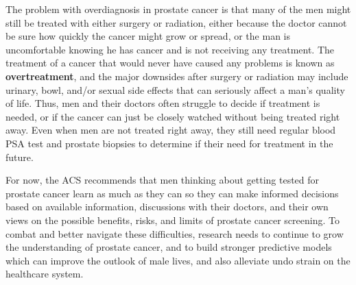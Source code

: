 The problem with overdiagnosis in prostate cancer is that many of the men might still be treated with either surgery or radiation, either because the doctor cannot be sure how quickly the cancer might grow or spread, or the man is uncomfortable knowing he has cancer and is not receiving any treatment. The treatment of a cancer that would never have caused any problems is known as \textbf{overtreatment}, and the major downsides after surgery or radiation may include urinary, bowl, and/or sexual side effects that can seriously affect a man's quality of life. Thus, men and their doctors often struggle to decide if treatment is needed, or if the cancer can just be closely watched without being treated right away. Even when men are not treated right away, they still need regular blood PSA test and prostate biopsies to determine if their need for treatment in the future. \par
For now, the ACS recommends that men thinking about getting tested for prostate cancer learn as much as they can so they can make informed decisions based on available information, discussions with their doctors, and their own views on the possible benefits, risks, and limits of prostate cancer screening. To combat and better navigate these difficulties, research needs to continue to grow the understanding of prostate cancer, and to build stronger predictive models which can improve the outlook of male lives, and also alleviate undo strain on the healthcare system.